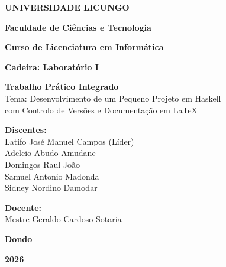 \documentclass[12pt,a4paper]{article}
\begin{document}
\begin{titlepage}
    \centering
    \vspace*{1cm}
    {\Large \textbf{UNIVERSIDADE LICUNGO} \par}
    \vspace{0.5cm}
    {\large \textbf{Faculdade de Ciências e Tecnologia} \par}
    {\large \textbf{Curso de Licenciatura em Informática} \par}
    \vspace{1.5cm}
    {\large \textbf{Cadeira: Laboratório I} \par}
    \vspace{1.5cm}
    {\Large \textbf{Trabalho Prático Integrado}} \\
    \vspace{0.5cm}
    {\large Tema: Desenvolvimento de um Pequeno Projeto em Haskell \\ com Controlo de Versões e Documentação em LaTeX} \par
    \vspace{1.5cm}
    
    \begin{flushleft}
    \textbf{Discentes:} \\
    \vspace{0.3cm}
    Latifo José Manuel Campos (Líder) \\
    Adelcio Abudo Amudane \\
    Domingos Raul João \\
    Samuel Antonio Madonda \\
    Sidney Nordino Damodar \\
    \end{flushleft}
    
    \vspace{1cm}
    \begin{flushright}
    \textbf{Docente:} \\
    \vspace{0.3cm}
    Mestre Geraldo Cardoso Sotaria \\
    \end{flushright}
    
    \vfill
    {\large \textbf{Dondo} \par}
    {\large \textbf{2026} \par}
\end{titlepage}

\tableofcontents
\newpage
\end{document}
